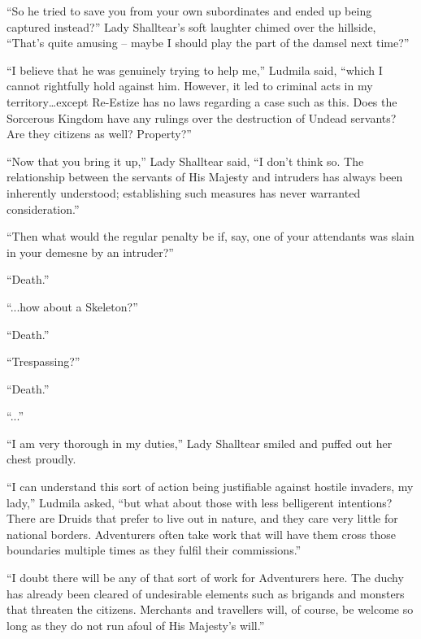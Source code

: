  

“So he tried to save you from your own subordinates and ended up being captured instead?” Lady Shalltear’s soft laughter chimed over the hillside, “That’s quite amusing – maybe I should play the part of the damsel next time?”

 

“I believe that he was genuinely trying to help me,” Ludmila said, “which I cannot rightfully hold against him. However, it led to criminal acts in my territory…except Re-Estize has no laws regarding a case such as this. Does the Sorcerous Kingdom have any rulings over the destruction of Undead servants? Are they citizens as well? Property?”

 

“Now that you bring it up,” Lady Shalltear said, “I don’t think so. The relationship between the servants of His Majesty and intruders has always been inherently understood; establishing such measures has never warranted consideration.”

 

“Then what would the regular penalty be if, say, one of your attendants was slain in your demesne by an intruder?”

 

“Death.”

 

“...how about a Skeleton?”

 

“Death.”

 

“Trespassing?”

 

“Death.”

 

“...”

 

“I am very thorough in my duties,” Lady Shalltear smiled and puffed out her chest proudly.

 

“I can understand this sort of action being justifiable against hostile invaders, my lady,” Ludmila asked, “but what about those with less belligerent intentions? There are Druids that prefer to live out in nature, and they care very little for national borders. Adventurers often take work that will have them cross those boundaries multiple times as they fulfil their commissions.”

 

“I doubt there will be any of that sort of work for Adventurers here. The duchy has already been cleared of undesirable elements such as brigands and monsters that threaten the citizens. Merchants and travellers will, of course, be welcome so long as they do not run afoul of His Majesty’s will.”

